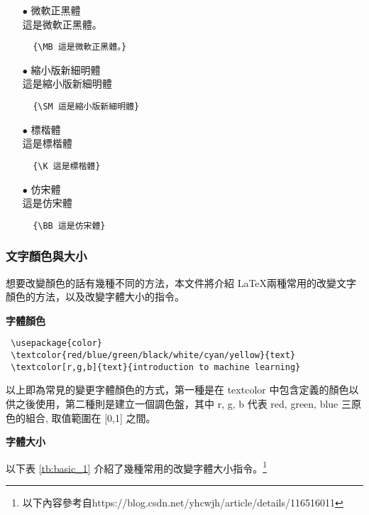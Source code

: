 \begin{itemize}
\item[$\bullet$] 微軟正黑體\\
{\MB 這是微軟正黑體。}
    \begin{lstlisting}
  {\MB 這是微軟正黑體。}
	\end{lstlisting}
\item[$\bullet$] 縮小版新細明體\\
{\SM 這是縮小版新細明體}
	\begin{lstlisting}
  {\SM 這是縮小版新細明體}
	\end{lstlisting}
\item[$\bullet$] 標楷體\\
{\K 這是標楷體}
    \begin{lstlisting}
  {\K 這是標楷體}
	\end{lstlisting}
\item[$\bullet$] 仿宋體\\
{\BB 這是仿宋體}
    \begin{lstlisting}
  {\BB 這是仿宋體}
	\end{lstlisting}
\end{itemize}

\subsubsection{文字顏色與大小}
想要改變顏色的話有幾種不同的方法，本文件將介紹 \LaTeX 兩種常用的改變文字顏色的方法，以及改變字體大小的指令。

\textbf{字體顏色}

\bigskip
\begin{lstlisting}
 \usepackage{color}
 \textcolor{red/blue/green/black/white/cyan/yellow}{text}
 \textcolor[r,g,b]{text}{introduction to machine learning}
\end{lstlisting}

以上即為常見的變更字體顏色的方式，第一種是在 textcolor{ } 中包含定義的顏色以供之後使用，第二種則是建立一個調色盤，其中 r, g, b 代表 red, green, blue 三原色的組合, 取值範圍在 [0,1] 之間。

\textbf{字體大小}

以下表 \ref{tb:basic_1} 介紹了幾種常用的改變字體大小指令。\footnote{以下內容參考自https://blog.csdn.net/yhcwjh/article/details/116516011}



